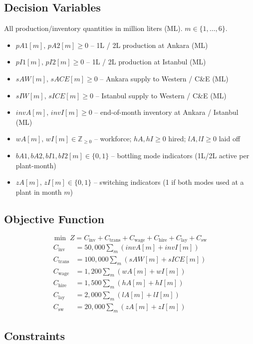 \documentclass[12pt,a4paper]{article}
\begin{document}
\subsection*{Decision Variables}

All production/inventory quantities in million liters (ML). $m\in\{1,\dots,6\}$.
\begin{itemize}
  \item $pA1[m],\,pA2[m]\geq0$ -- 1L / 2L production at Ankara (ML)
  \item $pI1[m],\,pI2[m]\geq0$ -- 1L / 2L production at Istanbul (ML)
  \item $sAW[m],\,sACE[m]\geq0$ -- Ankara supply to Western / C\&E (ML)
  \item $sIW[m],\,sICE[m]\geq0$ -- Istanbul supply to Western / C\&E (ML)
  \item $invA[m],\,invI[m]\geq0$ -- end-of-month inventory at Ankara / Istanbul (ML)
  \item $wA[m],\,wI[m]\in\mathbb{Z}_{\geq0}$ -- workforce; $hA,hI\geq0$ hired; $lA,lI\geq0$ laid off
  \item $bA1,bA2,bI1,bI2[m]\in\{0,1\}$ -- bottling mode indicators (1L/2L active per plant-month)
  \item $zA[m],\,zI[m]\in\{0,1\}$ -- switching indicators (1 if both modes used at a plant in month $m$)
\end{itemize}

\subsection*{Objective Function}

\[
\min\; Z = C_{\text{inv}}+C_{\text{trans}}+C_{\text{wage}}+C_{\text{hire}}+C_{\text{lay}}+C_{\text{sw}}
\]
\begin{align*}
C_{\text{inv}}   &= 50{,}000  \sum_m (invA[m]+invI[m]) \\
C_{\text{trans}} &= 100{,}000 \sum_m (sAW[m]+sICE[m]) \\
C_{\text{wage}}  &= 1{,}200   \sum_m (wA[m]+wI[m]) \\
C_{\text{hire}}  &= 1{,}500   \sum_m (hA[m]+hI[m]) \\
C_{\text{lay}}   &= 2{,}000   \sum_m (lA[m]+lI[m]) \\
C_{\text{sw}}    &= 20{,}000  \sum_m (zA[m]+zI[m])
\end{align*}

\subsection*{Constraints}
\end{document}
